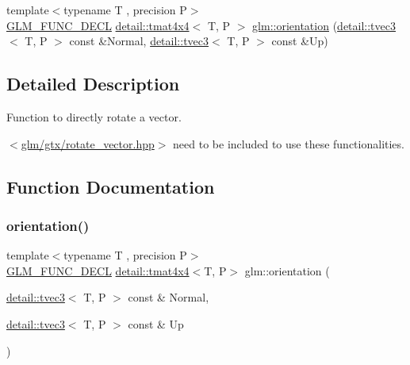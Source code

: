 \begin{DoxyCompactItemize}
\item 
{\footnotesize template$<$typename T , precision P$>$ }\\\hyperlink{setup_8hpp_ab2d052de21a70539923e9bcbf6e83a51}{G\+L\+M\+\_\+\+F\+U\+N\+C\+\_\+\+D\+E\+CL} \hyperlink{structglm_1_1detail_1_1tmat4x4}{detail\+::tmat4x4}$<$ T, P $>$ \hyperlink{group__gtx__rotate__vector_gac80aaf3b2af70c7f03f1077d4b6ac507}{glm\+::orientation} (\hyperlink{structglm_1_1detail_1_1tvec3}{detail\+::tvec3}$<$ T, P $>$ const \&Normal, \hyperlink{structglm_1_1detail_1_1tvec3}{detail\+::tvec3}$<$ T, P $>$ const \&Up)
\end{DoxyCompactItemize}


\subsection{Detailed Description}
Function to directly rotate a vector. 

$<$\hyperlink{rotate__vector_8hpp}{glm/gtx/rotate\+\_\+vector.\+hpp}$>$ need to be included to use these functionalities. 

\subsection{Function Documentation}
\mbox{\label{group__gtx__rotate__vector_gac80aaf3b2af70c7f03f1077d4b6ac507}} 
\subsubsection{\texorpdfstring{orientation()}{orientation()}}
{\footnotesize\ttfamily template$<$typename T , precision P$>$ \\
\hyperlink{setup_8hpp_ab2d052de21a70539923e9bcbf6e83a51}{G\+L\+M\+\_\+\+F\+U\+N\+C\+\_\+\+D\+E\+CL} \hyperlink{structglm_1_1detail_1_1tmat4x4}{detail\+::tmat4x4}$<$T, P$>$ glm\+::orientation (\begin{DoxyParamCaption}\item[{\hyperlink{structglm_1_1detail_1_1tvec3}{detail\+::tvec3}$<$ T, P $>$ const \&}]{Normal,  }\item[{\hyperlink{structglm_1_1detail_1_1tvec3}{detail\+::tvec3}$<$ T, P $>$ const \&}]{Up }\end{DoxyParamCaption})}

